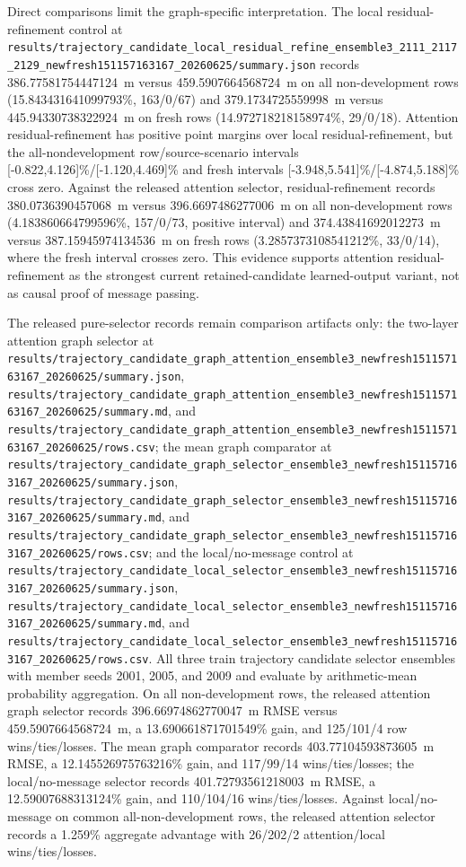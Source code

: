 \documentclass{article}
\begin{document}
Direct comparisons limit the graph-specific interpretation. The local residual-refinement control at \nolinkurl{results/trajectory_candidate_local_residual_refine_ensemble3_2111_2117_2129_newfresh151157163167_20260625/summary.json} records 386.77581754447124~m versus 459.5907664568724~m on all non-development rows (15.843431641099793\%, 163/0/67) and 379.1734725559998~m versus 445.94330738322924~m on fresh rows (14.972718218158974\%, 29/0/18). Attention residual-refinement has positive point margins over local residual-refinement, but the all-nondevelopment row/source-scenario intervals [-0.822,4.126]\%/[-1.120,4.469]\% and fresh intervals [-3.948,5.541]\%/[-4.874,5.188]\% cross zero. Against the released attention selector, residual-refinement records 380.0736390457068~m versus 396.6697486277006~m on all non-development rows (4.183860664799596\%, 157/0/73, positive interval) and 374.43841692012273~m versus 387.15945974134536~m on fresh rows (3.2857373108541212\%, 33/0/14), where the fresh interval crosses zero. This evidence supports attention residual-refinement as the strongest current retained-candidate learned-output variant, not as causal proof of message passing.

The released pure-selector records remain comparison artifacts only: the two-layer attention graph selector at \nolinkurl{results/trajectory_candidate_graph_attention_ensemble3_newfresh151157163167_20260625/summary.json}, \nolinkurl{results/trajectory_candidate_graph_attention_ensemble3_newfresh151157163167_20260625/summary.md}, and \nolinkurl{results/trajectory_candidate_graph_attention_ensemble3_newfresh151157163167_20260625/rows.csv}; the mean graph comparator at \nolinkurl{results/trajectory_candidate_graph_selector_ensemble3_newfresh151157163167_20260625/summary.json}, \nolinkurl{results/trajectory_candidate_graph_selector_ensemble3_newfresh151157163167_20260625/summary.md}, and \nolinkurl{results/trajectory_candidate_graph_selector_ensemble3_newfresh151157163167_20260625/rows.csv}; and the local/no-message control at \nolinkurl{results/trajectory_candidate_local_selector_ensemble3_newfresh151157163167_20260625/summary.json}, \nolinkurl{results/trajectory_candidate_local_selector_ensemble3_newfresh151157163167_20260625/summary.md}, and \nolinkurl{results/trajectory_candidate_local_selector_ensemble3_newfresh151157163167_20260625/rows.csv}. All three train trajectory candidate selector ensembles with member seeds 2001, 2005, and 2009 and evaluate by arithmetic-mean probability aggregation. On all non-development rows, the released attention graph selector records 396.66974862770047~m RMSE versus 459.5907664568724~m, a 13.690661871701549\% gain, and 125/101/4 row wins/ties/losses. The mean graph comparator records 403.77104593873605~m RMSE, a 12.145526975763216\% gain, and 117/99/14 wins/ties/losses; the local/no-message selector records 401.72793561218003~m RMSE, a 12.59007688313124\% gain, and 110/104/16 wins/ties/losses. Against local/no-message on common all-non-development rows, the released attention selector records a 1.259\% aggregate advantage with 26/202/2 attention/local wins/ties/losses.
\end{document}
